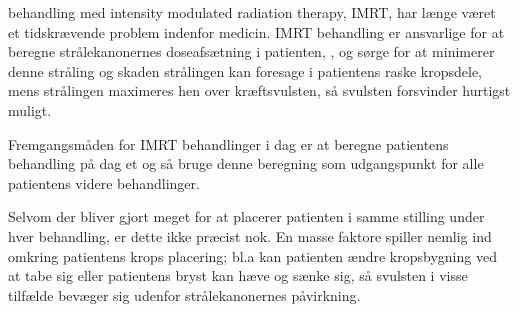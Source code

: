 



 behandling med intensity modulated radiation
therapy, IMRT, har længe været et tidskrævende problem indenfor
medicin. IMRT behandling er ansvarlige for at beregne strålekanonernes
doseafsætning i patienten, , og sørge for at minimerer denne stråling
og skaden strålingen kan foresage i patientens raske kropsdele, mens
strålingen maximeres hen over kræftsvulsten, så svulsten forsvinder
hurtigst muligt.

Fremgangsmåden for IMRT behandlinger i dag er at beregne patientens
behandling på dag et og så bruge denne beregning som udgangspunkt for
alle patientens videre behandlinger.

Selvom der bliver gjort meget for at placerer patienten i samme
stilling under hver behandling, er dette ikke præcist nok. En masse
faktore spiller nemlig ind omkring patientens krops placering; bl.a kan
patienten ændre kropsbygning ved at tabe sig eller patientens bryst
kan hæve og sænke sig, så svulsten i visse tilfælde bevæger sig
udenfor strålekanonernes påvirkning.

